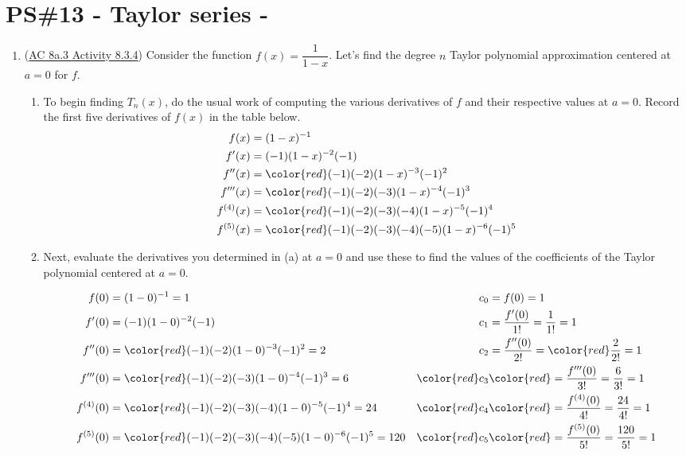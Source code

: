 


%


\allowdisplaybreaks
\section{PS\#13 - Taylor series -  }

\everymath{\displaystyle}
\begin{enumerate}[leftmargin=0pt]

\item (\href{https://faculty.gvsu.edu/boelkinm/Home/ACS/sec-8a-3-geometric.html#act-8a-3-3}{AC 8a.3 Activity 8.3.4}) Consider the function $f(x) = \dfrac{1}{1-x}$. Let's find the degree $n$ Taylor polynomial approximation centered at $a=0$ for $f$.
\begin{enumerate}
    \item To begin finding $T_n(x)$, do the usual work of computing the various derivatives of $f$ and their respective values at $a = 0$. Record the first five derivatives of $f(x)$ in the table below.
    \begin{align*}
        f(x) &= (1-x)^{-1} \\
        f'(x) &= (-1)(1-x)^{-2}(-1) \\
        f''(x) &= {\color{red} (-1)(-2)(1-x)^{-3}(-1)^2} \\
        f'''(x) &= {\color{red} (-1)(-2)(-3)(1-x)^{-4}(-1)^3} \\
        f^{(4)}(x) &= {\color{red} (-1)(-2)(-3)(-4)(1-x)^{-5}(-1)^4} \\
        f^{(5)}(x) &= {\color{red} (-1)(-2)(-3)(-4)(-5)(1-x)^{-6}(-1)^5}
    \end{align*}

    \item Next, evaluate the derivatives you determined in (a) at $a=0$ and use these to find the values of the coefficients of the Taylor polynomial centered at $a=0$.

    \begin{align*}
        f(0) &= (1-0)^{-1} = 1 & c_0 &= f(0) = 1 \\
        f'(0) &= (-1)(1-0)^{-2}(-1) & c_1 &= \dfrac{f'(0)}{1!} = \dfrac{1}{1!} = 1 \\
        f''(0) &= {\color{red} (-1)(-2)(1-0)^{-3}(-1)^2 = 2} 
        & c_2 &= \dfrac{f''(0)}{2!} = {\color{red} \dfrac{2}{2!} = 1}\\
        f'''(0) &= {\color{red} (-1)(-2)(-3)(1-0)^{-4}(-1)^3 = 6} 
        & {\color{red} c_3} &{\color{red} = \dfrac{f'''(0)}{3!} =  \dfrac{6}{3!} = 1}\\
        f^{(4)}(0) &= {\color{red} (-1)(-2)(-3)(-4)(1-0)^{-5}(-1)^4 = 24} 
        & {\color{red} c_4} &{\color{red} = \dfrac{f^{(4)}(0)}{4!} =  \dfrac{24}{4!} = 1}\\
        f^{(5)}(0) &= {\color{red} (-1)(-2)(-3)(-4)(-5)(1-0)^{-6}(-1)^5 = 120 }
        & {\color{red} c_5} &{\color{red} = \dfrac{f^{(5)}(0)}{5!} =  \dfrac{120}{5!} = 1}
    \end{align*}
    

\end{enumerate}
\end{enumerate}

